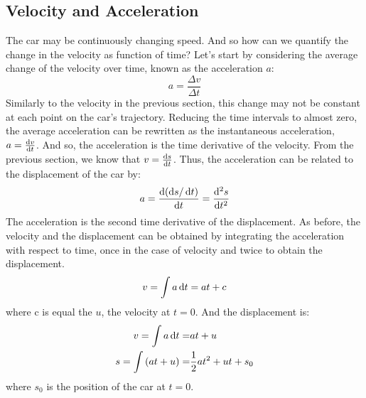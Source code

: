 \subsection{Velocity and Acceleration}
The car may be continuously changing speed. And so how can we quantify the change in the velocity as function of time? Let's start by considering the average change of the velocity over time, known as the acceleration $a$:
\begin{equation}
a = \frac{\Delta v}{\Delta t} 
\end{equation}
\nl
Similarly to the velocity in the previous section, this change may not be constant at each point on the car's trajectory. Reducing the time intervals to almost zero, the average acceleration can be rewritten as the instantaneous acceleration, $a = \frac{\operatorname{d}\! v}{\operatorname{d}\! t}$. And so, the acceleration is the time derivative of the velocity. From the previous section, we know that $v = \frac{\operatorname{d}\! s}{\operatorname{d}\! t}$. Thus, the acceleration can be related to the displacement of the car by:
\begin{equation}
a = \frac{\operatorname{d}\! \left(\operatorname{d}\! s/ \operatorname{d}\! t\right)}{\operatorname{d}\! t} = \frac{\operatorname{d}\!^2 s}{\operatorname{d}\! t^2} 
\end{equation}
 The acceleration is the second time derivative of the displacement. 
\nll
{}
\nl
As before, the velocity and the displacement can be obtained by integrating the acceleration with respect to time, once in the case of velocity and twice to obtain the displacement.
\begin{equation}
v = \int a \operatorname{d}\! t = at + c
\label{vel}
\end{equation}
where c is equal the $u$, the velocity at $t=0$. And the displacement is:
\begin{eqnarray}
v = \int a \operatorname{d}\! t =& at + u\\
s = \int \left(at + u\right) =& \frac{1}{2} a t^2 + u t + s_0
\label{s}
\end{eqnarray}
where $s_0$ is the position of the car at $t=0$. 

